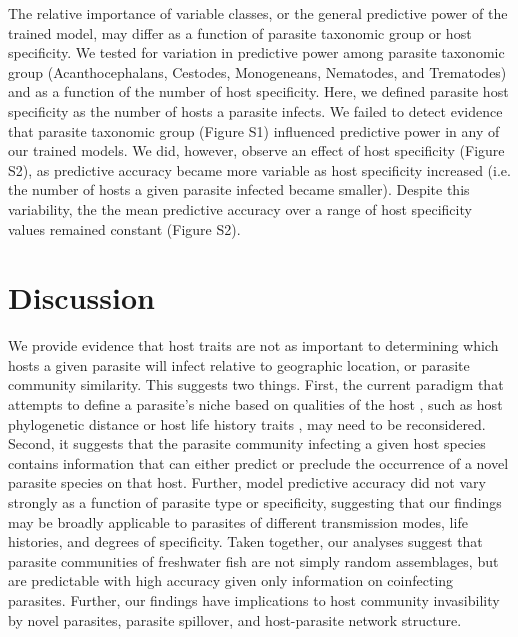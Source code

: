 \documentclass[12pt]{article}
\begin{document}
  The relative importance of variable classes, or the general predictive power of the trained model, may differ as a function of parasite taxonomic group or host specificity. We tested for variation in predictive power among parasite taxonomic group (Acanthocephalans, Cestodes, Monogeneans, Nematodes, and Trematodes) and as a function of the number of host specificity. Here, we defined parasite host specificity as the number of hosts a parasite infects. We failed to detect evidence that parasite taxonomic group (Figure S1) influenced predictive power in any of our trained models. We did, however, observe an effect of host specificity (Figure S2), as predictive accuracy became more variable as host specificity increased (i.e. the number of hosts a given parasite infected became smaller). Despite this variability, the the mean predictive accuracy over a range of host specificity values remained constant (Figure S2).  
  
  
  
\section*{Discussion}

 We provide evidence that host traits are not as important to determining which hosts a given parasite will infect relative to geographic location, or parasite community similarity. This suggests two things. First, the current paradigm that attempts to define a parasite's niche based on qualities of the host \cite{bush2001, poulin2011}, such as host phylogenetic distance \cite{adamson1994} or host life history traits \cite{sasal1999}, may need to be reconsidered. Second, it suggests that the parasite community infecting a given host species contains information that can either predict or preclude the occurrence of a novel parasite species on that host. Further, model predictive accuracy did not vary strongly as a function of parasite type or specificity, suggesting that our findings may be broadly applicable to parasites of different transmission modes, life histories, and degrees of specificity. Taken together, our analyses suggest that parasite communities of freshwater fish are not simply random assemblages, but are predictable with high accuracy given only information on coinfecting parasites. Further, our findings have implications to host community invasibility by novel parasites, parasite spillover, and host-parasite network structure. \\
 
\end{document}
